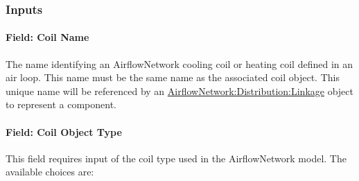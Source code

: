 \subsubsection{Inputs}\label{inputs-2016-06-16}

\paragraph{Field: Coil Name}\label{field-coil-name}

The name identifying an AirflowNetwork cooling coil or heating coil defined in an air loop. This name must be the same name as the associated coil object. This unique name will be referenced by an \hyperref[airflownetworkdistributionlinkage]{AirflowNetwork:Distribution:Linkage} object to represent a component.

\paragraph{Field: Coil Object Type}\label{field-coil-object-type}

This field requires input of the coil type used in the AirflowNetwork model. The available choices are:


